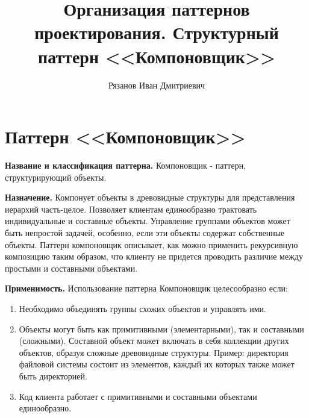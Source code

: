 \documentclass[PI,LAB]{HSEUniversity}
\title{Организация паттернов проектирования. Структурный паттерн <<Компоновщик>>}
\author{Рязанов Иван Дмитриевич}
\begin{document}
\maketitle
\chapter{Паттерн <<Компоновщик>>}
\textbf{Название и классификация паттерна.}
Компоновщик - паттерн, структурирующий объекты.

\textbf{Назначение.}
Компонует объекты в древовидные структуры для представления иерархий часть-целое. Позволяет клиентам единообразно трактовать индивидуальные и составные объекты.
Управление группами объектов может быть непростой задачей, особенно, если эти объекты содержат собственные объекты. Паттерн компоновщик описывает, как можно применить рекурсивную композицию таким образом, что клиенту не придется проводить различие между простыми и составными объектами.

\textbf{Применимость.}
Использование паттерна Компоновщик целесообразно если:
\begin{enumerate}
  \item Необходимо объединять группы схожих объектов и управлять ими. 
  \item Объекты могут быть как примитивными (элементарными), так и составными (сложными). Составной объект может включать в себя коллекции других объектов, образуя сложные древовидные структуры. Пример: директория файловой системы состоит из элементов, каждый их которых также может быть директорией. 
  \item Код клиента работает с примитивными и составными объектами единообразно.
\end{enumerate}
\clearpage
\end{document}
